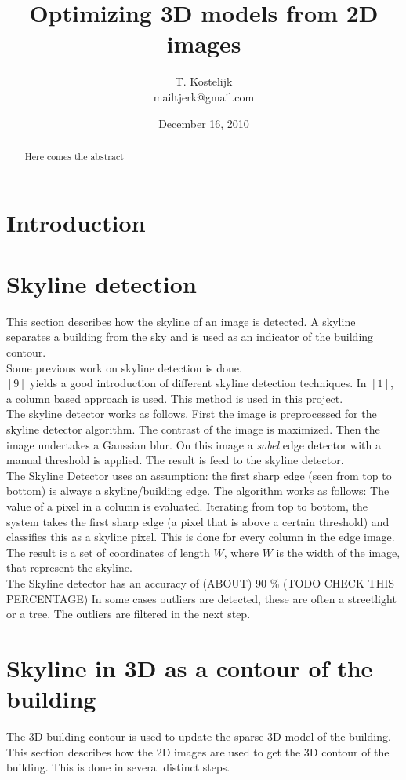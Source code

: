 \documentclass[10pt]{article}
\title{\sc Optimizing 3D models from 2D images}
\author{T. Kostelijk\\mailtjerk@gmail.com}
\date{December 16, 2010}
\begin{document}
\maketitle
\begin{abstract}
Here comes the abstract
\end{abstract}

\section{Introduction}

\section{Skyline detection}
This section describes how the skyline of an image is detected. A skyline
separates a building from the sky and is used as an indicator of the building contour.
\\
Some previous work on skyline detection is done.\\
$[9]$ yields a good introduction of different skyline detection techniques.
In $[1]$, a column based approach is used. This method is used in this project.
\\
The skyline detector works as follows.
First the image is preprocessed for the skyline detector algorithm.
The contrast of the image is maximized. Then the image undertakes a Gaussian blur.  On this image a
\textit{sobel} edge detector with a manual threshold is applied.
The result is feed to the skyline detector.
\\
The Skyline Detector uses an assumption: the first sharp edge (seen
from top to bottom) is always a skyline/building edge. The algorithm works as
follows: The value of a pixel in a column is evaluated. Iterating from top to
bottom, the system takes the first sharp edge (a pixel that is above a certain
threshold) and classifies this as a skyline pixel.  This is done for every
column in the edge image. The result is a set of coordinates of length $W$,
where $W$ is the width of the image, that represent the skyline.
\\
The Skyline detector has an accuracy of (ABOUT) 90 \% (TODO CHECK THIS PERCENTAGE) 
In some cases outliers are detected, these are often a streetlight or a tree. The outliers are
filtered in the next step.

\section{Skyline in 3D as a contour of the building}
The 3D building contour is used to update the sparse 3D model of the building.
This section describes how the 2D images are used to get the 3D contour of the
building. This is done in several distinct steps.  
\end{document}
